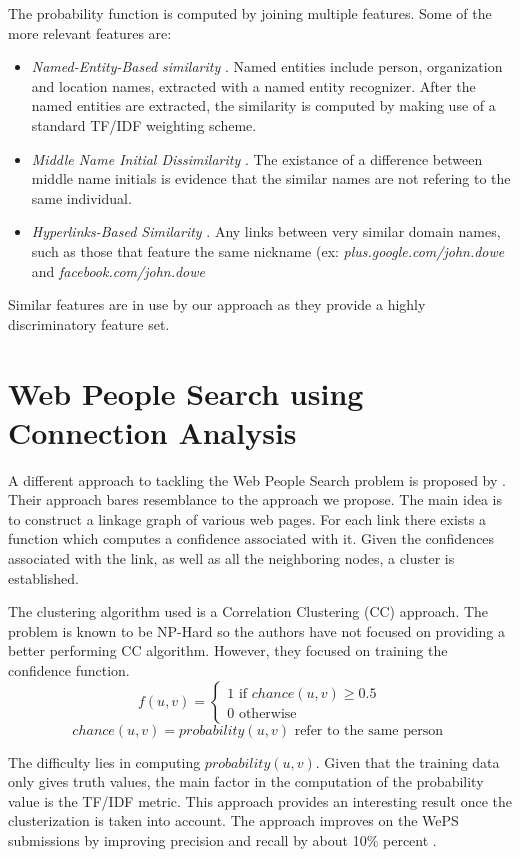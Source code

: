 The probability function is computed by joining multiple features. Some of the more
relevant features are:
\begin {itemize}
\item
   {\em Named-Entity-Based similarity \/}. Named entities include person, organization and location names,
   extracted with a named entity recognizer. After the named entities are extracted,
   the similarity is computed by making use of a standard TF/IDF weighting scheme.
\item
   {\em Middle Name Initial Dissimilarity \/}. The existance of a difference between
   middle name initials is evidence that the similar names are not refering to the same
   individual.
\item
   {\em Hyperlinks-Based Similarity \/}. Any links between very similar domain names,
   such as those that feature the same nickname (ex: {\em plus.google.com/john.dowe \/}
   and {\em facebook.com/john.dowe \/}
\end {itemize}

Similar features are in use by our approach as they provide a highly discriminatory
feature set.


\section{Web People Search using Connection Analysis}
A different approach to tackling the Web People Search problem is proposed by
\cite{connection-analysis}. Their approach bares resemblance to the approach
we propose. The main idea is to construct a linkage graph of various web pages.
For each link there exists a function which computes a confidence associated with
it. Given the confidences associated with the link, as well as all the neighboring
nodes, a cluster is established.

The clustering algorithm used is a Correlation Clustering (CC) approach.
\cite{correlation-clustering} The problem is known to be NP-Hard so the authors
have not focused on providing a better performing CC algorithm. However, they
focused on training the confidence function.
\[ f(u, v) =
    \left\{
        \begin{array}{ll}
            1 \mbox{ if } chance(u, v) \geq 0.5 \\
            0 \mbox{ otherwise}
        \end{array}
    \right.
\]
\[ chance(u, v) = probability(u,v) \mbox{ refer to the same person } \]

The difficulty lies in computing $ probability(u,v) $. Given that the training
data only gives truth values, the main factor in the computation of the
probability value is the TF/IDF metric. This approach provides an interesting
result once the clusterization is taken into account. The approach improves
on the WePS submissions by improving precision and recall by about 10\% percent
\cite{connection-analysis}.
